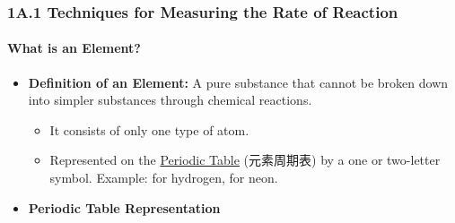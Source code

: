 
\subsubsection{1A.1 Techniques for Measuring the Rate of Reaction}
\paragraph{What is an Element?}
\begin{itemize}
    \item \textbf{Definition of an Element:} A pure substance that cannot be broken down into simpler substances through
    chemical reactions.
    \begin{itemize}
        \item It consists of only one type of atom.
        \item Represented on the \underline{Periodic Table} (元素周期表) by a one or two-letter symbol. Example:  for
        hydrogen,  for neon.
    \end{itemize}
    \item \textbf{Periodic Table Representation}
    
\end{itemize}